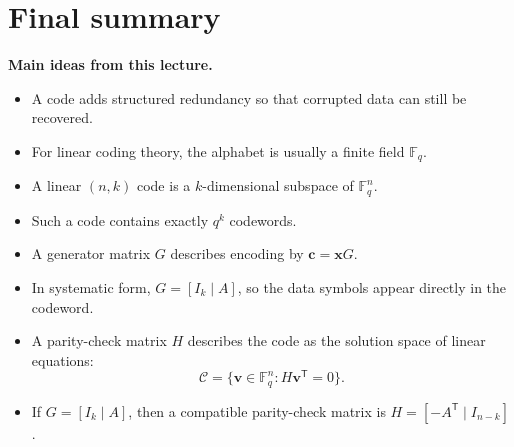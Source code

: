 \documentclass[11pt]{article}
\newcommand{\F}{\mathbb{F}}
\newcommand{\code}{\mathcal{C}}
\newcommand{\vect}[1]{\bm{#1}}
\newcommand{\transpose}{^{\mathsf T}}
\begin{document}
\section{Final summary}

\begin{summarybox}
\textbf{Main ideas from this lecture.}
\begin{itemize}
  \item A code adds structured redundancy so that corrupted data can still be recovered.
  \item For linear coding theory, the alphabet is usually a finite field \(\F_q\).
  \item A linear \((n,k)\) code is a \(k\)-dimensional subspace of \(\F_q^n\).
  \item Such a code contains exactly \(q^k\) codewords.
  \item A generator matrix \(G\) describes encoding by \(\vect c=\vect xG\).
  \item In systematic form, \(G=[I_k\mid A]\), so the data symbols appear directly in the codeword.
  \item A parity-check matrix \(H\) describes the code as the solution space of linear equations:
  \[
  \code=\{\vect v\in \F_q^n:H\vect v\transpose=0\}.
  \]
  \item If \(G=[I_k\mid A]\), then a compatible parity-check matrix is \(H=[-A\transpose\mid I_{n-k}]\).
\end{itemize}
\end{summarybox}
\end{document}

